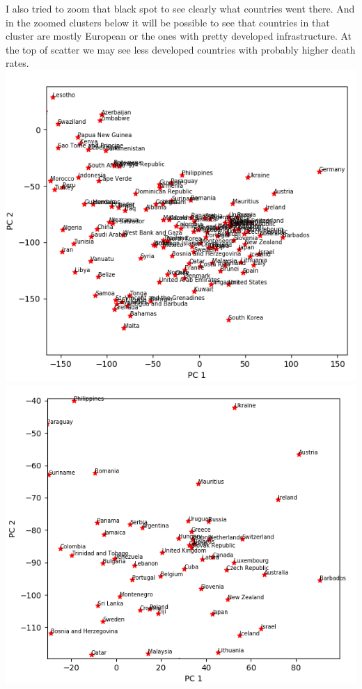 \documentclass[12pt, letterpaper]{article}
\begin{document}
\begin{enumerate}[label=\Roman*.]
	I also tried to zoom that black spot to see clearly what countries went there. And in the zoomed clusters below it will be possible to see that countries in that cluster are mostly European or the ones with pretty developed infrastructure. At the top of scatter we may see less developed countries with probably higher death rates. \\ 
	\includegraphics[scale=0.85]{figure_2.png} \\
	\includegraphics[scale=0.85]{figure_3.png} \\
	

\end{enumerate}
\end{document}
